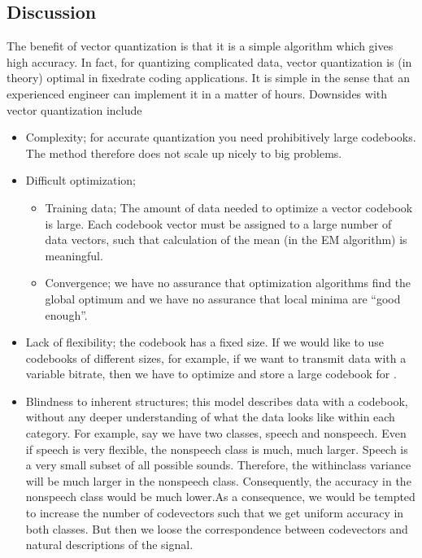 \documentclass[letterpaper,10pt,english]{jupyterBook}
\begin{document}
\subsection{Discussion}
\label{\detokenize{Modelling/Vector_quantization_VQ:discussion}}
\sphinxAtStartPar
The benefit of vector quantization is that it is a simple algorithm
which gives high accuracy. In fact, for quantizing complicated data,
vector quantization is (in theory) optimal in fixed\sphinxhyphen{}rate coding
applications. It is simple in the sense that an experienced engineer can
implement it in a matter of hours. Downsides with vector quantization
include
\begin{itemize}
\item {} 
\sphinxAtStartPar
Complexity; for accurate quantization you need prohibitively large
codebooks. The method therefore does not scale up nicely to big
problems.

\item {} 
\sphinxAtStartPar
Difficult optimization;
\begin{itemize}
\item {} 
\sphinxAtStartPar
Training data; The amount of data needed to optimize a vector
codebook is large. Each codebook vector must be assigned to a
large number of data vectors, such that calculation of the mean
(in the EM algorithm) is meaningful.

\item {} 
\sphinxAtStartPar
Convergence; we have no assurance that optimization algorithms
find the global optimum and we have no assurance that local
minima are “good enough”.

\end{itemize}

\item {} 
\sphinxAtStartPar
Lack of flexibility; the codebook has a fixed size. If we would like
to use codebooks of different sizes, for example, if we want to
transmit data with a variable bit\sphinxhyphen{}rate, then we have to optimize and
store a large codebook for .

\item {} 
\sphinxAtStartPar
Blindness to inherent structures; this model describes data with a
codebook, without any deeper understanding of what the data looks
like within each category. For example, say we have two classes,
speech and non\sphinxhyphen{}speech. Even if speech is very flexible, the
non\sphinxhyphen{}speech class is much, much larger. Speech is a very small subset
of all possible sounds. Therefore, the within\sphinxhyphen{}class variance will be
much larger in the non\sphinxhyphen{}speech class. Consequently, the accuracy in
the non\sphinxhyphen{}speech class would be much lower.As a consequence, we would be tempted to increase the number of
codevectors such that we get uniform accuracy in both classes. But
then we loose the correspondence between codevectors and natural
descriptions of the signal.

\end{itemize}
\end{document}
